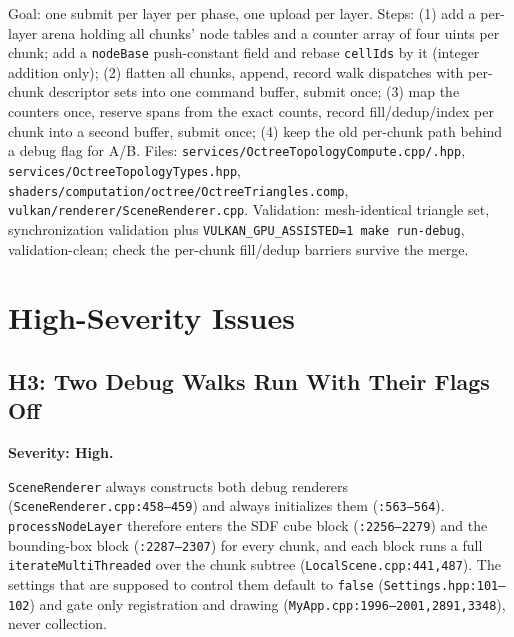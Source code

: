 \documentclass[11pt,a4paper]{article}
\begin{document}
\begin{tcolorbox}[promptbox={Prompt --- C2: batched topology, one arena}]
Goal: one submit per layer per phase, one upload per layer. Steps: (1) add a
per-layer arena holding all chunks' node tables and a counter array of four
uints per chunk; add a \texttt{nodeBase} push-constant field and rebase
\texttt{cellIds} by it (integer addition only); (2) flatten all chunks, append,
record walk dispatches with per-chunk descriptor sets into one command
buffer, submit once; (3) map the counters once, reserve spans from the exact
counts, record fill/dedup/index per chunk into a second buffer, submit once;
(4) keep the old per-chunk path behind a debug flag for A/B. Files:
\texttt{services/OctreeTopologyCompute.cpp/.hpp},
\texttt{services/OctreeTopologyTypes.hpp},
\texttt{shaders/\allowbreak computation/\allowbreak octree/\allowbreak OctreeTriangles.comp},
\texttt{vulkan/\allowbreak renderer/\allowbreak SceneRenderer.cpp}. Validation: mesh-identical
triangle set, synchronization validation plus
\texttt{VULKAN\_GPU\_ASSISTED=1 make run-debug}, validation-clean; check the
per-chunk fill/dedup barriers survive the merge.
\end{tcolorbox}

\section{High-Severity Issues}

\subsection{H3: Two Debug Walks Run With Their Flags Off}
\label{sec:h3}

\textbf{Severity: High.}

\texttt{SceneRenderer} always constructs both debug renderers
(\texttt{SceneRenderer.cpp:458--459}) and always initializes them
(\texttt{:563--564}). \texttt{processNodeLayer} therefore enters the SDF
cube block (\texttt{:2256--2279}) and the bounding-box block
(\texttt{:2287--2307}) for every chunk, and each block runs a full
\texttt{iterateMultiThreaded} over the chunk subtree
(\texttt{LocalScene.cpp:441,487}). The settings that are supposed to control
them default to \texttt{false} (\texttt{Settings.hpp:101--102}) and gate only
registration and drawing (\texttt{MyApp.cpp:1996--2001,2891,3348}), never
collection.
\end{document}
